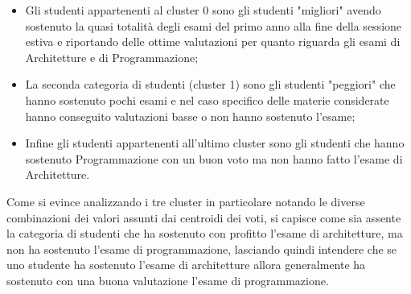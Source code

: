 \documentclass[12pt]{article}
\begin{document}
\begin{itemize}
	\item Gli studenti appartenenti al cluster 0 sono gli studenti "migliori" a\-vendo sostenuto la quasi totalità degli esami del primo anno alla fine della sessione estiva e riportando delle ottime valutazioni per quanto riguarda gli esami di Architetture e di Programmazione;
	\item La seconda categoria di studenti (cluster 1) sono gli studenti "peg\-giori" che hanno sostenuto pochi esami e nel caso specifico delle materie considerate hanno conseguito valutazioni basse o non hanno sostenuto l'esame;
	\item Infine gli studenti appartenenti all'ultimo cluster sono gli studenti che hanno sostenuto Programmazione con un buon voto ma non hanno fatto l'esame di Architetture.
\end{itemize}
Come si evince analizzando i tre cluster in particolare notando le diverse combinazioni dei valori assunti dai centroidi dei voti, si capisce come sia assente la categoria di studenti che ha sostenuto con profitto l'esame di architetture, ma non ha sostenuto l'esame di programmazione,
lasciando quindi intendere che se uno studente ha sostenuto l'esame di architetture allora generalmente ha sostenuto con una buona valutazione l'esame di programmazione.



\end{document}
